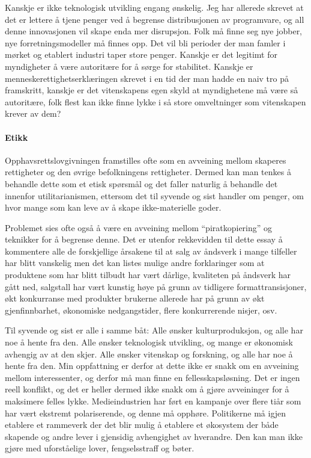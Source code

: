 \documentclass[11pt,norsk,a4paper]{article}
\begin{document}
Kanskje er ikke teknologisk utvikling engang ønskelig. Jeg har
allerede skrevet at det er lettere å tjene penger ved å begrense
distribusjonen av programvare, og all denne innovasjonen vil skape
enda mer disrupsjon. Folk må finne seg nye jobber, nye
forretningsmodeller må finnes opp. Det vil bli perioder der man famler
i mørket og etablert industri taper store penger. Kanskje er det
legitimt for myndigheter å være autoritære for å sørge for
stabilitet. Kanskje er menneskerettighetserklæringen skrevet i en tid
der man hadde en naiv tro på framskritt, kanskje er det vitenskapens
egen skyld at myndighetene må være så autoritære, folk flest kan ikke
finne lykke i  så store omveltninger som vitenskapen krever av dem?

\paragraph{Etikk}

Opphavsrettslovgivningen framstilles ofte som en avveining mellom
skaperes rettigheter og den øvrige befolkningens rettigheter. Dermed
kan man tenkes å behandle dette som et etisk spørsmål og det faller
naturlig å behandle det innenfor utilitarianismen, ettersom det til
syvende og sist handler om penger, om hvor mange som kan leve av å
skape ikke-materielle goder.

Problemet sies ofte også å være en avveining mellom ``piratkopiering''
og teknikker for å begrense denne. Det er utenfor rekkevidden til
dette essay å kommentere alle de forskjellige årsakene til at
salg av åndsverk i mange tilfeller har blitt vanskelig men det
kan listes mulige andre forklaringer som at produktene som har blitt
tilbudt har vært dårlige, kvaliteten på åndsverk har gått ned,
salgstall har vært kunstig høye på grunn av tidligere
formattransisjoner, økt konkurranse med produkter brukerne allerede
har på grunn av økt gjenfinnbarhet, økonomiske nedgangstider, flere
konkurrerende nisjer, osv. 

Til syvende og sist er alle i samme båt: Alle ønsker kulturproduksjon,
og alle har noe å hente fra den. Alle ønsker teknologisk utvikling, og
mange er økonomisk avhengig av at den skjer. Alle ønsker vitenskap og
forskning, og alle har noe å hente fra den. 
Min oppfattning er derfor at dette ikke er snakk om en avveining
mellom interessenter, og derfor må man finne en
fellesskapsløsning. Det er ingen reell konflikt, og det er heller
dermed ikke snakk om å gjøre avveininger for å maksimere felles
lykke. Medieindustrien har ført en kampanje over flere
tiår som har vært ekstremt polariserende, og denne må
opphøre. Politikerne må igjen etablere et rammeverk der det blir mulig
å etablere et økosystem der både skapende og andre lever i gjensidig
avhengighet av hverandre. Den kan man ikke gjøre med uforståelige
lover, fengselsstraff og bøter. 

{}

\end{document}
